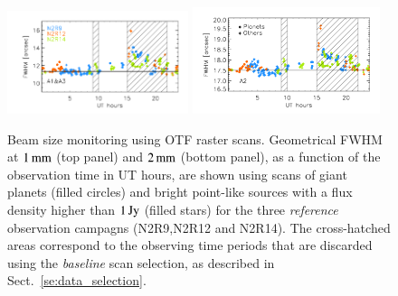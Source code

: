 \begin{figure}[ht!]
  \begin{center}
    \includegraphics[clip=true, trim={0.9cm, 0.5cm, 0.5cm, 0.5cm}, width=0.4725\textwidth]{Figures/Beam_monitoring_with_otfs_vs_ut_1mm.pdf}
    \includegraphics[clip=true, trim={0.5cm, 0.5cm, 0.5cm, 0.5cm}, width=0.4875\textwidth]{Figures/Beam_monitoring_with_otfs_vs_ut_a2.pdf}
    \caption[Beam size monitoring using OTF scans]{Beam size
      monitoring using OTF raster scans. Geometrical FWHM at $1\,\rm{mm}$ (top panel)
      and $2\,\rm{mm}$ (bottom panel), as a function of the
      observation time in UT hours, are shown using scans of giant
      planets (filled circles) and bright point-like sources with a
      flux density higher than $1\,\rm{Jy}$ (filled stars) for the three \emph{reference}
      observation campagns (N2R9,N2R12 and N2R14). The cross-hatched areas
      correspond to the observing time periods that are discarded using
      the \emph{baseline} scan selection, as described in Sect.~\ref{se:data_selection}.} 
\label{fig:beam_monitoring_otf}
  \end{center}
\end{figure}


